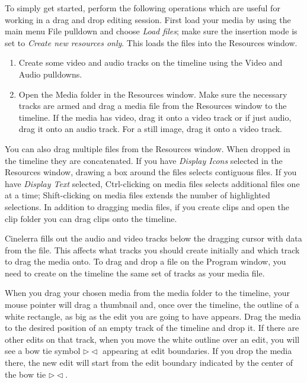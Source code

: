 To simply get started, perform the following operations which are useful for working in a drag and drop editing session.  First load your media by using the main menu File pulldown and choose \textit{Load files}; make sure the insertion mode is set to \textit{Create new resources only}.  This loads the files into the Resources window.

\begin{enumerate}
    \item Create some video and audio tracks on the timeline using the Video and Audio pulldowns.
    \item Open the Media folder in the Resources window.  Make sure the necessary tracks are armed and drag
    a media file from the Resources window to the timeline. If the media has video, drag it onto a video 
    track or if just audio, drag it onto an audio track. For a still image, drag it onto a video track.
\end{enumerate}

\noindent You can also drag multiple files from the Resources window. When dropped in the timeline they are concatenated. If you have \textit{Display Icons} selected in the Resources window, drawing a box around the files selects contiguous files. If you have \textit{Display Text} selected, Ctrl-clicking on media files selects additional files one at a time; Shift-clicking on media files extends the number of highlighted selections.  In addition to dragging media files, if you create clips and open the clip folder you can drag
clips onto the timeline.

Cinelerra fills out the audio and video tracks below the dragging cursor with data from the file. This affects what tracks you should create initially and which track to drag the media onto. To drag and drop a file on the Program window, you need to create on the timeline the same set of tracks as your media file.

When you drag your chosen media from the media folder to the timeline, your mouse pointer will drag a thumbnail and, once over the timeline, the outline of a white rectangle, as big as the edit you are going to have appears.  Drag the media to the desired position of an empty track of the timeline and drop it.  If there are other edits on that track, when you move the white outline over an edit, you will see a bow tie symbol $\rhd\lhd$ appearing at edit boundaries. If you drop the media there, the new edit will start from the edit boundary indicated by the center of the bow tie $\rhd\lhd$.

